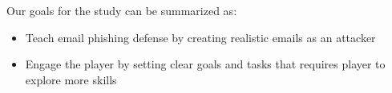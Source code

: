 Our goals for the study can be summarized as:

\begin{itemize}
    \item Teach email phishing defense by creating realistic emails as an attacker
    \item Engage the player by setting clear goals and tasks that requires player to explore more skills
\end{itemize}



